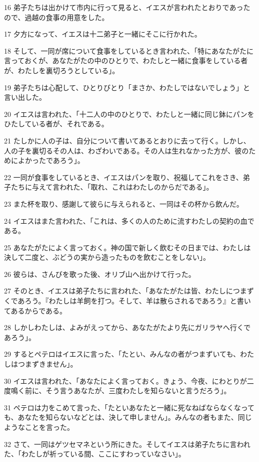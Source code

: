 \par 16 弟子たちは出かけて市内に行って見ると、イエスが言われたとおりであったので、過越の食事の用意をした。
\par 17 夕方になって、イエスは十二弟子と一緒にそこに行かれた。
\par 18 そして、一同が席について食事をしているとき言われた、「特にあなたがたに言っておくが、あなたがたの中のひとりで、わたしと一緒に食事をしている者が、わたしを裏切ろうとしている」。
\par 19 弟子たちは心配して、ひとりびとり「まさか、わたしではないでしょう」と言い出した。
\par 20 イエスは言われた、「十二人の中のひとりで、わたしと一緒に同じ鉢にパンをひたしている者が、それである。
\par 21 たしかに人の子は、自分について書いてあるとおりに去って行く。しかし、人の子を裏切るその人は、わざわいである。その人は生れなかった方が、彼のためによかったであろう」。
\par 22 一同が食事をしているとき、イエスはパンを取り、祝福してこれをさき、弟子たちに与えて言われた、「取れ、これはわたしのからだである」。
\par 23 また杯を取り、感謝して彼らに与えられると、一同はその杯から飲んだ。
\par 24 イエスはまた言われた、「これは、多くの人のために流すわたしの契約の血である。
\par 25 あなたがたによく言っておく。神の国で新しく飲むその日までは、わたしは決して二度と、ぶどうの実から造ったものを飲むことをしない」。
\par 26 彼らは、さんびを歌った後、オリブ山へ出かけて行った。
\par 27 そのとき、イエスは弟子たちに言われた、「あなたがたは皆、わたしにつまずくであろう。『わたしは羊飼を打つ。そして、羊は散らされるであろう』と書いてあるからである。
\par 28 しかしわたしは、よみがえってから、あなたがたより先にガリラヤへ行くであろう」。
\par 29 するとペテロはイエスに言った、「たとい、みんなの者がつまずいても、わたしはつまずきません」。
\par 30 イエスは言われた、「あなたによく言っておく。きょう、今夜、にわとりが二度鳴く前に、そう言うあなたが、三度わたしを知らないと言うだろう」。
\par 31 ペテロは力をこめて言った、「たといあなたと一緒に死なねばならなくなっても、あなたを知らないなどとは、決して申しません」。みんなの者もまた、同じようなことを言った。
\par 32 さて、一同はゲツセマネという所にきた。そしてイエスは弟子たちに言われた、「わたしが祈っている間、ここにすわっていなさい」。
